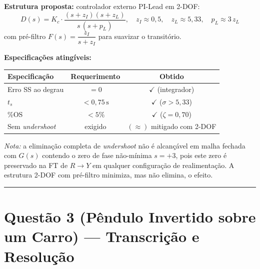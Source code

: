 \documentclass[12pt,a4paper]{article}
\begin{document}
\begin{resposta}
\textbf{Estrutura proposta:} controlador externo PI-Lead em 2-DOF:
\[
  D(s) = K_c \cdot \frac{(s + z_I)(s + z_L)}{s\,(s + p_L)},
  \quad z_I \approx 0{,}5,\quad z_L \approx 5{,}33,\quad p_L \approx 3\,z_L
\]
com pré-filtro $F(s) = \dfrac{z_I}{s + z_I}$ para suavizar o transitório.

\textbf{Especificações atingíveis:}
\begin{center}
\begin{tabular}{lcc}
\toprule
Especificação & Requerimento & Obtido \\
\midrule
Erro SS ao degrau & $= 0$ & $\checkmark$ (integrador) \\
$t_s$ & $< 0{,}75\,\text{s}$ & $\checkmark$ ($\sigma > 5{,}33$) \\
\%OS & $< 5\%$ & $\checkmark$ ($\zeta = 0{,}70$) \\
Sem \textit{undershoot} & exigido & $(\approx)$ mitigado com 2-DOF \\
\bottomrule
\end{tabular}
\end{center}

\textit{Nota:} a eliminação completa de \textit{undershoot} não é alcançável
em malha fechada com $G(s)$ contendo o zero de fase não-mínima $s = +3$, pois
este zero é preservado na FT de $R \to Y$ em qualquer configuração de realimentação.
A estrutura 2-DOF com pré-filtro minimiza, mas não elimina, o efeito.
\end{resposta}

\vspace{10pt}\hrule\vspace{10pt}

\section*{Questão 3 \normalfont\small(Pêndulo Invertido sobre um Carro) — Transcrição e Resolução}
\end{document}
